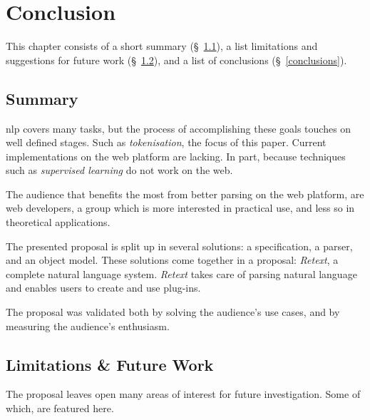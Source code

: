 \chapter{Conclusion}\label{conclusion}

This chapter consists of a short summary (§~\ref{summary}), a list
  limitations and suggestions for future work
  (§~\ref{limitations-future-work}), and a list of conclusions
  (§~\ref{conclusions}).

\section{Summary}\label{summary}

\gls{nlp} covers many tasks, but the process of accomplishing
  these goals touches on well defined stages.
Such as \emph{tokenisation}, the focus of this paper.
Current implementations on the web platform are lacking.
In part, because techniques such as \emph{supervised learning} do not work
  on the web.

The audience that benefits the most from better parsing on the web platform,
  are web developers, a group which is more interested in practical use, and
  less so in theoretical applications.

The presented proposal is split up in several solutions: a specification, a
  parser, and an object model.
These solutions come together in a proposal: \emph{Retext}, a complete natural
  language system.
\emph{Retext} takes care of parsing natural language and enables users to
  create and use plug-ins.

The proposal was validated both by solving the audience's use cases, and
  by measuring the audience's enthusiasm.

\section{Limitations \& Future Work}\label{limitations-future-work}

The proposal leaves open many areas of interest for future investigation.
Some of which, are featured here.

